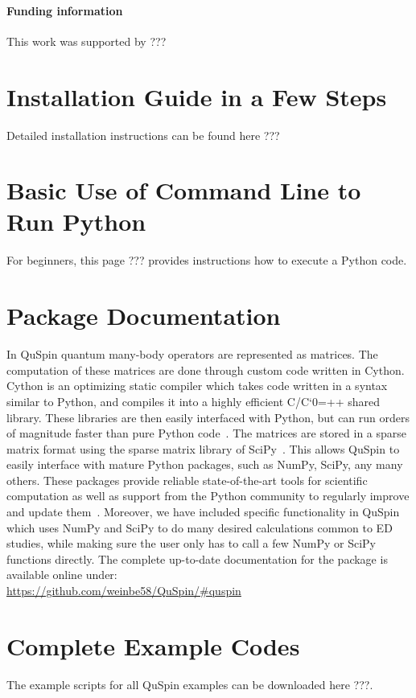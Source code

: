 \documentclass{SciPost}
\newcommand\0{\scalebox{-1}[1]{0}}
\let\svttfamily\ttfamily
\renewcommand\ttfamily{\svttfamily\catcode`0=\active }
\renewcommand\texttt{\bgroup\ttfamily\texttthelp}
\def\texttthelp#1{#1\egroup}
\begin{document}
\paragraph{Funding information}
This work was supported by ???
\begin{appendix}
	
\section{Installation Guide in a Few Steps}
	\label{app:install}
	
	Detailed installation instructions can be found here ???
	
	
	
\section{Basic Use of Command Line to Run Python}
\label{app:cmd_line}

For beginners, this page ??? provides instructions how to execute a Python code.
	
\section{Package Documentation}
\label{app:doc}
In QuSpin quantum many-body operators are represented as matrices. The computation of these matrices are done through custom code written in Cython. Cython is an optimizing static compiler which takes code written in a syntax similar to Python, and compiles it into a highly efficient C/C\texttt{++} shared library. These libraries are then easily interfaced with Python, but can run orders of magnitude faster than pure Python code~\cite{Cython}. The matrices are stored in a sparse matrix format using the sparse matrix library of SciPy~\cite{SciPy_package}. This allows QuSpin to easily interface with mature Python packages, such as NumPy, SciPy, any many others. These packages provide reliable state-of-the-art tools for scientific computation as well as support from the Python community to regularly improve and update them~\cite{NumPy,Python_computing_1,Python_computing_2,SciPy_package}. Moreover, we have included specific functionality in QuSpin which uses NumPy and SciPy to do many desired calculations common to ED studies, while making sure the user only has to call a few NumPy or SciPy functions directly. The complete up-to-date documentation for the package is available online under:\\
	
\href{https://github.com/weinbe58/QuSpin/#quspin}{https://github.com/weinbe58/QuSpin/\#quspin}\\
	
\section{Complete Example Codes}
\label{app:scripts}
	
	The example scripts for all QuSpin examples can be downloaded here ???.
	
\end{appendix}
\end{document}
